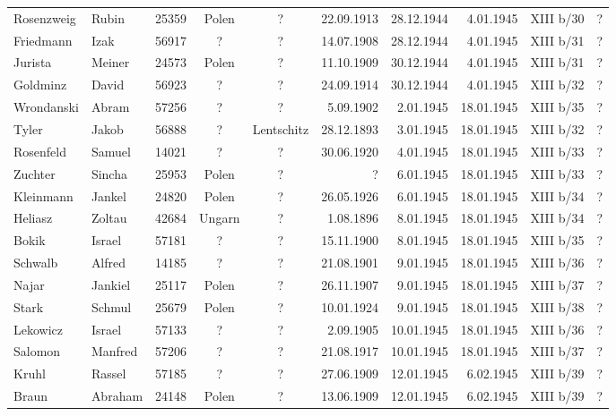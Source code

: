 \begin{tiny}
\begin{longtable}[l]{|l|l|r|c|c|r|r|r|c|r|}
Rosenzweig  &  Rubin  & 25359 &  Polen  &  ?  & 22.09.1913 & 28.12.1944 & 4.01.1945 &  XIII b/30  &  ? \\[3pt]
Friedmann  &  Izak  & 56917 &  ?  &  ?  & 14.07.1908 & 28.12.1944 & 4.01.1945 &  XIII b/31  &  ? \\[3pt]
Jurista  &  Meiner  & 24573 &  Polen  &  ?  & 11.10.1909 & 30.12.1944 & 4.01.1945 &  XIII b/31  &  ? \\[3pt]
Goldminz  &  David  & 56923 &  ?  &  ?  & 24.09.1914 & 30.12.1944 & 4.01.1945 &  XIII b/32  &  ? \\[3pt]
Wrondanski  &  Abram  & 57256 &  ?  &  ?  & 5.09.1902 & 2.01.1945 & 18.01.1945 &  XIII b/35  &  ? \\[3pt]
Tyler  &  Jakob  & 56888 &  ?  &  Lentschitz  & 28.12.1893 & 3.01.1945 & 18.01.1945 &  XIII b/32  &  ? \\[3pt]
Rosenfeld  &  Samuel  & 14021 &  ?  &  ?  & 30.06.1920 & 4.01.1945 & 18.01.1945 &  XIII b/33  &  ? \\[3pt]
Zuchter  &  Sincha  & 25953 &  Polen  &  ?  & ?  & 6.01.1945 & 18.01.1945 &  XIII b/33  &  ? \\[3pt]
Kleinmann  &  Jankel  & 24820 &  Polen  &  ?  & 26.05.1926 & 6.01.1945 & 18.01.1945 &  XIII b/34  &  ? \\[3pt]
Heliasz  &  Zoltau  & 42684 &  Ungarn  &  ?  & 1.08.1896 & 8.01.1945 & 18.01.1945 &  XIII b/34  &  ? \\[3pt]
Bokik  &  Israel  & 57181 &  ?  &  ?  & 15.11.1900 & 8.01.1945 & 18.01.1945 &  XIII b/35  &  ? \\[3pt]
Schwalb  &  Alfred  & 14185 &  ?  &  ?  & 21.08.1901 & 9.01.1945 & 18.01.1945 &  XIII b/36  &  ? \\[3pt]
Najar  &  Jankiel  & 25117 &  Polen  &  ?  & 26.11.1907 & 9.01.1945 & 18.01.1945 &  XIII b/37  &  ? \\[3pt]
Stark  &  Schmul  & 25679 &  Polen  &  ?  & 10.01.1924 & 9.01.1945 & 18.01.1945 &  XIII b/38  &  ? \\[3pt]
Lekowicz  &  Israel  & 57133 &  ?  &  ?  & 2.09.1905 & 10.01.1945 & 18.01.1945 &  XIII b/36  &  ? \\[3pt]
Salomon  &  Manfred  & 57206 &  ?  &  ?  & 21.08.1917 & 10.01.1945 & 18.01.1945 &  XIII b/37  &  ? \\[3pt]
Kruhl  &  Rassel  & 57185 &  ?  &  ?  & 27.06.1909 & 12.01.1945 & 6.02.1945 &  XIII b/39  &  ? \\[3pt]
Braun   &  Abraham  & 24148 &  Polen  &  ?  & 13.06.1909 & 12.01.1945 & 6.02.1945 &  XIII b/39  &  ? \\[3pt]

\end{longtable}
\end{tiny}
